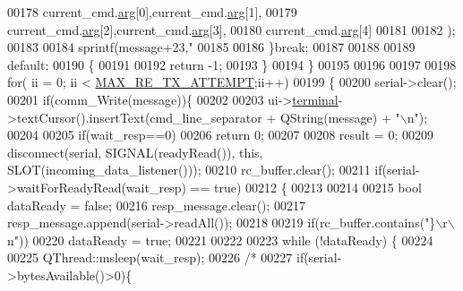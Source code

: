 \begin{DoxyCode}
{{{{{{{{{{{{{{00178                                     current\_cmd.\hyperlink{a00001_a56e6c2d7315d0ae60a51e8b140c9cfe4}{arg}[0],current\_cmd.\hyperlink{a00001_a56e6c2d7315d0ae60a51e8b140c9cfe4}{arg}[1],
00179                                     current\_cmd.\hyperlink{a00001_a56e6c2d7315d0ae60a51e8b140c9cfe4}{arg}[2],current\_cmd.\hyperlink{a00001_a56e6c2d7315d0ae60a51e8b140c9cfe4}{arg}[3],
00180                                     current\_cmd.\hyperlink{a00001_a56e6c2d7315d0ae60a51e8b140c9cfe4}{arg}[4]
00181 
00182                                     );
00183 
00184        sprintf(message+23,\textcolor{stringliteral}{"%
00185 
00186        \}\textcolor{keywordflow}{break};
00187 
00188 
00189        \textcolor{keywordflow}{default}:
00190        \{
00191 
00192            \textcolor{keywordflow}{return} -1;
00193        \}
00194    \}
00195 
00196 
00197 
00198    \textcolor{keywordflow}{for}( ii = 0; ii < \hyperlink{a00034_ae024113875b4670b57f70611ff982543}{MAX\_RE\_TX\_ATTEMPT};ii++)
00199    \{
00200       serial->clear();
00201       \textcolor{keywordflow}{if}(comm\_Write(message))\{
00202 
00203           ui->\hyperlink{a00027_aae71c46ea4546df5994735dee573b2dd}{terminal}->textCursor().insertText(cmd\_line\_separator + QString(message) + \textcolor{stringliteral}{"\(\backslash\)n"});
00204 
00205           \textcolor{keywordflow}{if}(wait\_resp==0)
00206               \textcolor{keywordflow}{return} 0;
00207 
00208           result = 0;
00209           disconnect(serial, SIGNAL(readyRead()), \textcolor{keyword}{this}, SLOT(incoming\_data\_listener()));
00210               rc\_buffer.clear();
00211               \textcolor{keywordflow}{if}(serial->waitForReadyRead(wait\_resp) == \textcolor{keyword}{true})
00212               \{
00213 
00214 
00215                      \textcolor{keywordtype}{bool} dataReady = \textcolor{keyword}{false};
00216                      resp\_message.clear();
00217                      resp\_message.append(serial->readAll());
00218 
00219                      \textcolor{keywordflow}{if}(rc\_buffer.contains(\textcolor{stringliteral}{"\}\(\backslash\)r\(\backslash\)n"}))
00220                          dataReady = \textcolor{keyword}{true};
00221 
00222 
00223                    \textcolor{keywordflow}{while} (!dataReady) \{
00224 
00225                        QThread::msleep(wait\_resp);
00226                        \textcolor{comment}{/*}
00227 \textcolor{comment}{                       if(serial->bytesAvailable()>0)\{}
}}}}}}}}}}}}}}}
\end{DoxyCode}
